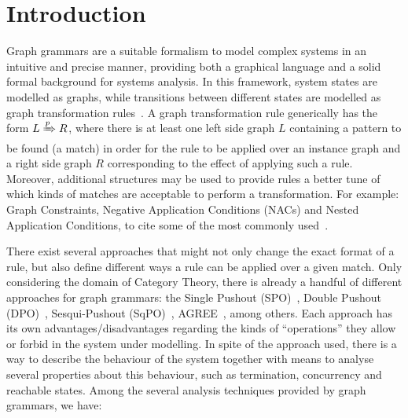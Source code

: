 \chapter{Introduction}

Graph grammars are a suitable formalism to model complex systems in an intuitive and precise manner, providing both a graphical language and a solid formal background for systems analysis.
In this framework, system states are modelled as graphs, while transitions between different states are modelled as graph transformation rules~\cite{Ehrig2006}.
A graph transformation rule generically has the form $L \xRightarrow{p} R$, where there is at least one left side graph $L$ containing a pattern to be found (a match) in order for the rule to be applied over an instance graph and a right side graph $R$ corresponding to the effect of applying such a rule.
Moreover, additional structures may be used to provide rules a better tune of which kinds of matches are acceptable to perform a transformation.
For example: Graph Constraints, Negative Application Conditions (NACs) and Nested Application Conditions, to cite some of the most commonly used~\cite{Habel2005}.

There exist several approaches that might not only change the exact format of a rule, but also define different ways a rule can be applied over a given match. Only considering the domain of Category Theory, there is already a handful of different approaches for graph grammars: the Single Pushout (SPO)~\cite{Ehrig:1997:AAG:278918.278930}, Double Pushout (DPO)~\cite{Corradini1996:DPO}, Sesqui-Pushout (SqPO)~\cite{Corradini:2006:SR:2162651.2162657}, AGREE~\cite{agree}, among others. Each approach has its own advantages/disadvantages regarding the kinds of  ``operations'' they allow or forbid in the system under modelling.
In spite of the approach used, there is a way to describe the behaviour of the system together with means to analyse several properties about this behaviour, such as termination, concurrency and reachable states. Among the several analysis techniques provided by graph grammars, we have:

